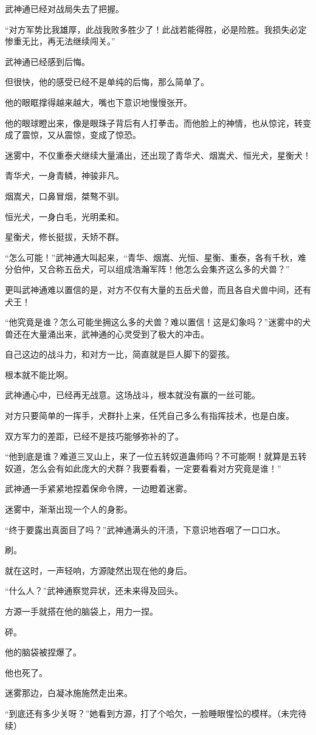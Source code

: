 \begin{this_body}
武神通已经对战局失去了把握。

“对方军势比我雄厚，此战我败多胜少了！此战若能得胜，必是险胜。我损失必定惨重无比，再无法继续闯关。”

武神通已经感到后悔。

但很快，他的感受已经不是单纯的后悔，那么简单了。

他的眼眶撑得越来越大，嘴也下意识地慢慢张开。

他的眼球瞪出来，像是眼珠子背后有人打拳击。而他脸上的神情，也从惊诧，转变成了震惊，又从震惊，变成了惊恐。

迷雾中，不仅重泰犬继续大量涌出，还出现了青华犬、烟嵩犬、恒光犬，星衡犬！

青华犬，一身青鳞，神骏非凡。

烟嵩犬，口鼻冒烟，桀骜不驯。

恒光犬，一身白毛，光明柔和。

星衡犬，修长挺拔，夭矫不群。

“怎么可能！”武神通大叫起来，“青华、烟嵩、光恒、星衡、重泰，各有千秋，难分伯仲，又合称五岳犬，可以组成浩瀚军阵！他怎么会集齐这么多的犬兽？”

更叫武神通难以置信的是，对方不仅有大量的五岳犬兽，而且各自犬兽中间，还有犬王！

“他究竟是谁？怎么可能坐拥这么多的犬兽？难以置信！这是幻象吗？”迷雾中的犬兽还在大量涌出来，武神通的心灵受到了极大的冲击。

自己这边的战斗力，和对方一比，简直就是巨人脚下的婴孩。

根本就不能比啊。

武神通心中，已经再无战意。这场战斗，根本就没有赢的一丝可能。

对方只要简单的一挥手，犬群扑上来，任凭自己多么有指挥技术，也是白废。

双方军力的差距，已经不是技巧能够弥补的了。

“他到底是谁？难道三叉山上，来了一位五转奴道蛊师吗？不可能啊！就算是五转奴道，怎么会有如此庞大的犬群？我要看看，一定要看看对方究竟是谁！”

武神通一手紧紧地捏着保命令牌，一边瞪着迷雾。

迷雾中，渐渐出现一个人的身影。

“终于要露出真面目了吗？”武神通满头的汗渍，下意识地吞咽了一口口水。

刷。

就在这时，一声轻响，方源陡然出现在他的身后。

“什么人？”武神通察觉异状，还未来得及回头。

方源一手就搭在他的脑袋上，用力一捏。

砰。

他的脑袋被捏爆了。

他也死了。

迷雾那边，白凝冰施施然走出来。

“到底还有多少关呀？”她看到方源，打了个哈欠，一脸睡眼惺忪的模样。（未完待续）

\end{this_body}

